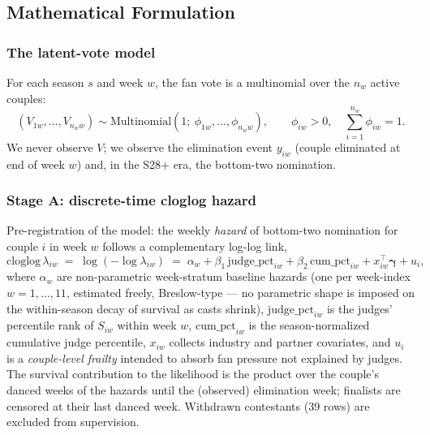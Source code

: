 \documentclass[10pt]{article}
\begin{document}
\subsection{Mathematical Formulation}

\subsubsection{The latent-vote model}

For each season $s$ and week $w$, the fan vote is a multinomial over the $n_w$ active
couples:
\begin{equation}
(V_{1w},\dots,V_{n_w w}) \sim \mathrm{Multinomial}(1;\ \phi_{1w},\dots,\phi_{n_w w}),
\qquad \phi_{iw}>0,\quad \sum_{i=1}^{n_w}\phi_{iw}=1.
\label{eq:multinomial}
\end{equation}
We never observe $V$; we observe the elimination event $y_{iw}$ (couple eliminated at end
of week $w$) and, in the S28+ era, the bottom-two nomination.

\subsubsection{Stage A: discrete-time cloglog hazard}

Pre-registration of the model: the weekly \emph{hazard} of bottom-two nomination for
couple $i$ in week $w$ follows a complementary log-log link,
\begin{equation}
\mathrm{cloglog}\,\lambda_{iw} \;=\; \log(-\log \lambda_{iw}) \;=\; \alpha_{w}
+ \beta_1\,\mathrm{judge\_pct}_{iw} + \beta_2\,\mathrm{cum\_pct}_{iw}
+ x_{iw}^{\top}\boldsymbol\gamma + u_i,
\label{eq:hazard}
\end{equation}
where $\alpha_w$ are non-parametric week-stratum baseline hazards (one per week-index
$w=1,\dots,11$, estimated freely, Breslow-type --- no parametric shape is imposed on the
within-season decay of survival as casts shrink), $\mathrm{judge\_pct}_{iw}$ is the
judges' percentile rank of $S_{iw}$ within week $w$, $\mathrm{cum\_pct}_{iw}$ is the
season-normalized cumulative judge percentile, $x_{iw}$ collects industry and partner
covariates, and $u_i$ is a \emph{couple-level frailty} intended to absorb fan pressure not
explained by judges. The survival contribution to the likelihood is the product over the
couple's danced weeks of the hazards until the (observed) elimination week; finalists are
censored at their last danced week. Withdrawn contestants (39 rows) are excluded from
supervision.
\end{document}
